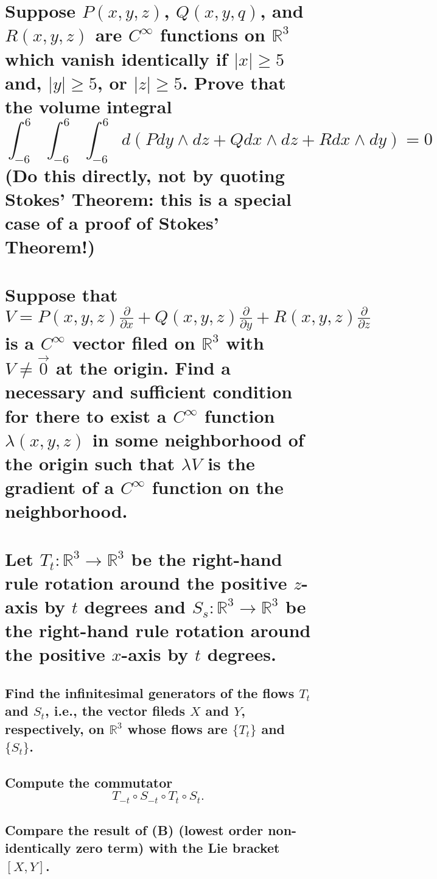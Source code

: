 \documentclass[10pt]{article}
\newcommand{\R}{\ensuremath{\mathbb{R}}} \newcommand{\RP}{\ensuremath{\mathbb{RP}}}
\newcommand{\del}{\ensuremath{\partial}} \newcommand{\rank}{\ensuremath{\mathrm{rank}}}
\newcommand{\question}{\section} \newcommand{\subquestion}{\subsection}
\begin{document}
 

\question{Suppose $P(x,y,z)$, $Q(x,y,q)$, and $R(x,y,z)$ are $C^\infty$ functions on $\R^3$ which
  vanish identically if $|x| \geq 5$ and, $|y| \geq 5$, or $|z| \geq 5$. Prove that the volume
  integral
$$\int_{-6}^6 \int_{-6}^6 \int_{-6}^6 d(P dy \wedge dz + Q dx \wedge dz + R dx \wedge
dy) =0$$ (Do this directly, not by quoting Stokes' Theorem: this is a special case of a proof of
Stokes' Theorem!)  }

\question{Suppose that $V = P(x,y,z) \frac{\del}{\del x} + Q(x,y,z) \frac{\del}{\del y} + R(x,y,z)
  \frac{\del}{\del z} $ is a $C^{\infty} $ vector filed on $\R^{3}$ with $V \not= \vec{0}$ at the
  origin. Find a necessary and sufficient condition for there to exist a $C^{\infty} $ function
  $\lambda(x,y,z) $ in some neighborhood of the origin such that $\lambda V$ is the gradient of a
  $C^{\infty}$ function on the neighborhood.  }

\question{Let $T_t : \R^3 \to \R^3$ be the right-hand rule rotation around the positive $z$-axis by
  $t$ degrees and $S_s : \R^3 \to \R^3 $ be the right-hand rule rotation around the positive
  $x$-axis by $t$ degrees.}

\subquestion{Find the infinitesimal generators of the flows $T_t$ and $S_t$, i.e., the vector fileds
$X$ and $Y$, respectively, on $\R^3$ whose flows are $\{T_t\} $ and $\{ S_t\}$.}

\subquestion{Compute the commutator $$T_{-t}\circ S_{-t}\circ T_t\circ S_t .$$}

\subquestion{Compare the result of (B) (lowest order non-identically zero term) with the Lie bracket
$[X,Y]$.}
\end{document}
